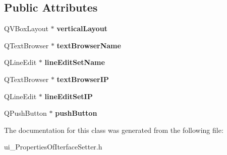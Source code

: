 \subsection*{Public Attributes}
\begin{DoxyCompactItemize}
\item 
\hypertarget{class_ui___properties_of_iterface_setter_a52471b969988836abf34a190d94062ef}{Q\-V\-Box\-Layout $\ast$ {\bfseries vertical\-Layout}}\label{class_ui___properties_of_iterface_setter_a52471b969988836abf34a190d94062ef}

\item 
\hypertarget{class_ui___properties_of_iterface_setter_aef3c2c43ce73ec0ee36d081fab127299}{Q\-Text\-Browser $\ast$ {\bfseries text\-Browser\-Name}}\label{class_ui___properties_of_iterface_setter_aef3c2c43ce73ec0ee36d081fab127299}

\item 
\hypertarget{class_ui___properties_of_iterface_setter_a2a1916e08fd46b92fb882df0f8b382a8}{Q\-Line\-Edit $\ast$ {\bfseries line\-Edit\-Set\-Name}}\label{class_ui___properties_of_iterface_setter_a2a1916e08fd46b92fb882df0f8b382a8}

\item 
\hypertarget{class_ui___properties_of_iterface_setter_a6612613fdf5923d6ace48b2d6a1fa6ed}{Q\-Text\-Browser $\ast$ {\bfseries text\-Browser\-I\-P}}\label{class_ui___properties_of_iterface_setter_a6612613fdf5923d6ace48b2d6a1fa6ed}

\item 
\hypertarget{class_ui___properties_of_iterface_setter_afb0a0d439e195ef37f1a97bb44c8bd83}{Q\-Line\-Edit $\ast$ {\bfseries line\-Edit\-Set\-I\-P}}\label{class_ui___properties_of_iterface_setter_afb0a0d439e195ef37f1a97bb44c8bd83}

\item 
\hypertarget{class_ui___properties_of_iterface_setter_acb11c1f8238a2ac75e388daa1ab4a9b4}{Q\-Push\-Button $\ast$ {\bfseries push\-Button}}\label{class_ui___properties_of_iterface_setter_acb11c1f8238a2ac75e388daa1ab4a9b4}

\end{DoxyCompactItemize}


The documentation for this class was generated from the following file\-:\begin{DoxyCompactItemize}
\item 
ui\-\_\-\-Properties\-Of\-Iterface\-Setter.\-h\end{DoxyCompactItemize}
